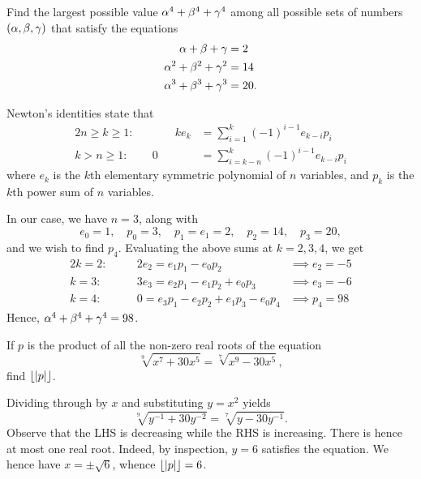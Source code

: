 \begin{question}[98]\label{Q::2021-O-1-9}
    Find the largest possible value $\alpha^4 + \beta^4 + \gamma^4$ among all possible sets of numbers $(\alpha, \beta, \gamma)$ that satisfy the equations
    \[\begin{aligned}
        \alpha + \beta + \gamma &= 2\\
        \alpha^2 + \beta^2 + \gamma^2 &= 14\\
        \alpha^3 + \beta^3 + \gamma^3 &= 20.
    \end{aligned}\]
\end{question}
\begin{solution*}
    Newton's identities state that
    \begin{alignat*}{2}
        n \geq k \geq 1 :&& \qquad ke_k &= \sum_{i=1}^k (-1)^{i-1} e_{k-i} p_i\\
        k > n \geq 1 :&& 0 &= \sum_{i=k-n}^k (-1)^{i-1} e_{k-i} p_i
    \end{alignat*}
    where $e_k$ is the $k$th elementary symmetric polynomial of $n$ variables, and $p_k$ is the $k$th power sum of $n$ variables.
    
    In our case, we have $n=3$, along with \[e_0 = 1, \quad p_0 = 3, \quad p_1 = e_1 = 2, \quad p_2 = 14, \quad p_3 = 20,\] and we wish to find $p_4$. Evaluating the above sums at $k = 2, 3, 4$, we get
    \begin{alignat*}{2}
        k = 2 : && \quad2e_2 = e_1p_1 - e_0p_2 &\implies e_2 = -5\\
        k = 3 : && \quad 3e_3 = e_2p_1 - e_1p_2 + e_0p_3 &\implies e_3 = -6\\
        k = 4 : && \quad 0 = e_3p_1 - e_2p_2 + e_1p_3 - e_0p_4 &\implies p_4 = 98
    \end{alignat*}
    Hence, $\alpha^4 + \beta^4 + \gamma^4 = 98$.
\end{solution*}

\begin{question}[6]\label{Q::2021-O-1-10}
    If $p$ is the product of all the non-zero real roots of the equation \[\sqrt[9]{x^7 + 30x^5} = \sqrt[7]{x^9 - 30x^5},\] find $\left\lfloor \left\lvert p \right\rvert \right\rfloor$.
\end{question}
\begin{solution*}
    Dividing through by $x$ and substituting $y = x^2$ yields \[\sqrt[9]{y^{-1} + 30y^{-2}} = \sqrt[7]{y - 30y^{-1}}.\] Observe that the LHS is decreasing while the RHS is increasing. There is hence at most one real root. Indeed, by inspection, $y = 6$ satisfies the equation. We hence have $x = \pm \sqrt 6$, whence $\left\lfloor \left\lvert p \right\rvert \right\rfloor = 6$.
\end{solution*}

